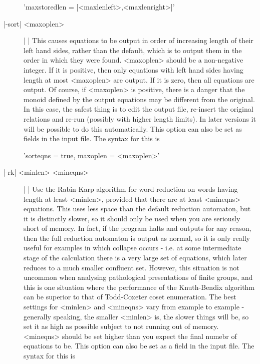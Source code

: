 \begin{description}
'maxstoredlen \:= [<maxlenleft>,<maxlenright>]'
\item[|-sort| <maxoplen>] | |\newline
This causes equations to be output in order of increasing length of their
left hand sides, rather than the default, which is to output them in the
order in which they were found. <maxoplen> should be a non-negative integer.
If it is positive, then only equations with left hand sides having length
at most <maxoplen> are output. If it is zero, then all equations are output.
Of course, if <maxoplen> is positive, there is a danger that the monoid
defined by the output equations may be different from the original.
In this case, the safest thing is to edit the output file,
re-insert the original relations and re-run (possibly with higher length
limits). In later versions it will be possible to do this automatically.
This option can also be set as fields in the input file.
The syntax for this is

'sorteqns \:= true, maxoplen \:= <maxoplen>'
\item[|-rk| <minlen> <mineqns>] | |\newline
Use the Rabin-Karp algorithm for word-reduction on words having length at least
<minlen>, provided that there are at least <mineqns> equations.
This uses less space than the default reduction automaton, but it is
distinctly slower, so it should only be used when you are seriously short of
memory.
In fact, if the program halts and outputs for any reason, then
the full reduction automaton is output as normal, so it is only really
useful for examples in which collapse occurs - i.e. at some intermediate
stage of the calculation there is a very large set of equations, which later
reduces to a much smaller confluent set. However, this situation is not
uncommon when analysing pathological presentations of finite groups, and
this is one situation where the performance of the Knuth-Bendix algorithm can
be superior to that of Todd-Coxeter coset enumeration.
The best settings for <minlen> and <mineqns> vary from example to
example - generally speaking, the smaller <minlen> is, the slower things
will be, so set it as high as possible subject to not running out of memory.
<mineqns> should be set higher than you expect the final numebr of
equations to be.
This option can also be set as a field in the input file.
The syntax for this is


\end{description}
